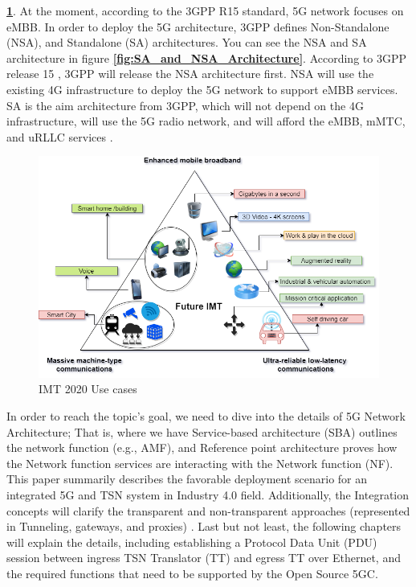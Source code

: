 \textbf{\ref{fig:IMT_2020_Use-cases}}. At the moment, according to the 3GPP R15 standard, 5G network focuses on eMBB. In order to deploy the 5G architecture, 3GPP defines Non-Standalone (NSA), and Standalone (SA) architectures. You can see the NSA and SA architecture in figure \textbf{\ref{fig:SA_and_NSA_Architecture}}. According to 3GPP release 15 \cite{5G_Tech_Spec_Group_Ser2018study}, 3GPP will release the NSA architecture first. NSA will use the existing 4G infrastructure to deploy the 5G network to support eMBB services. SA is the aim architecture from 3GPP, which will not depend on the 4G infrastructure, will use the 5G radio network, and will afford the eMBB, mMTC, and uRLLC services \cite{Gsma_5G_implguid_study}.
 


\begin{figure}

\centering
\includegraphics[scale=0.40]{images/IMT_2020_Use-cases.png}
\caption{IMT 2020 Use cases \cite{rancy2016imt}}
\label{fig:IMT_2020_Use-cases}
\end{figure}

In order to reach the topic's goal, we need to dive into the details of 5G Network Architecture; That is, where we have 
Service-based architecture (SBA) outlines the network function (e.g., AMF), and Reference point architecture proves how the Network function services are interacting with the Network function (NF)\cite{5G_Tech_Spec_Group_Ser2018study}.
This paper summarily describes the favorable deployment scenario for an integrated 5G and TSN system in Industry 4.0 field. Additionally, the Integration concepts will clarify the transparent and non-transparent approaches (represented in Tunneling, gateways, and proxies) \cite{ Eri_Gar_Theo_Oper_TSN2017study} \cite{Neumann2018}. \hfill \break
Last but not least, the following chapters will explain the details, including establishing a Protocol Data Unit (PDU) session between ingress TSN Translator (TT) and egress TT over Ethernet, and the required functions that need to be supported by the Open Source 5GC.




